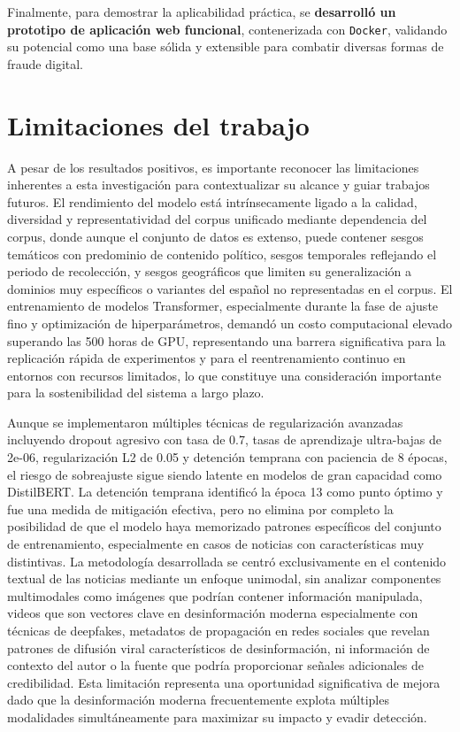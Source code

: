 Finalmente, para demostrar la aplicabilidad práctica, se \textbf{desarrolló un prototipo de aplicación web funcional}, contenerizada con \texttt{Docker}, validando su potencial como una base sólida y extensible para combatir diversas formas de fraude digital.

\section{Limitaciones del trabajo}

A pesar de los resultados positivos, es importante reconocer las limitaciones inherentes a esta investigación para contextualizar su alcance y guiar trabajos futuros. El rendimiento del modelo está intrínsecamente ligado a la calidad, diversidad y representatividad del corpus unificado mediante dependencia del corpus, donde aunque el conjunto de datos es extenso, puede contener sesgos temáticos con predominio de contenido político, sesgos temporales reflejando el periodo de recolección, y sesgos geográficos que limiten su generalización a dominios muy específicos o variantes del español no representadas en el corpus. El entrenamiento de modelos Transformer, especialmente durante la fase de ajuste fino y optimización de hiperparámetros, demandó un costo computacional elevado superando las 500 horas de GPU, representando una barrera significativa para la replicación rápida de experimentos y para el reentrenamiento continuo en entornos con recursos limitados, lo que constituye una consideración importante para la sostenibilidad del sistema a largo plazo.

Aunque se implementaron múltiples técnicas de regularización avanzadas incluyendo dropout agresivo con tasa de 0.7, tasas de aprendizaje ultra-bajas de 2e-06, regularización L2 de 0.05 y detención temprana con paciencia de 8 épocas, el riesgo de sobreajuste sigue siendo latente en modelos de gran capacidad como DistilBERT. La detención temprana identificó la época 13 como punto óptimo y fue una medida de mitigación efectiva, pero no elimina por completo la posibilidad de que el modelo haya memorizado patrones específicos del conjunto de entrenamiento, especialmente en casos de noticias con características muy distintivas. La metodología desarrollada se centró exclusivamente en el contenido textual de las noticias mediante un enfoque unimodal, sin analizar componentes multimodales como imágenes que podrían contener información manipulada, videos que son vectores clave en desinformación moderna especialmente con técnicas de deepfakes, metadatos de propagación en redes sociales que revelan patrones de difusión viral característicos de desinformación, ni información de contexto del autor o la fuente que podría proporcionar señales adicionales de credibilidad. Esta limitación representa una oportunidad significativa de mejora dado que la desinformación moderna frecuentemente explota múltiples modalidades simultáneamente para maximizar su impacto y evadir detección.

